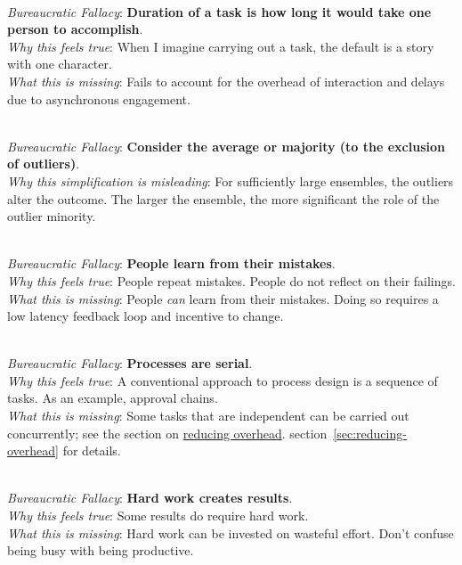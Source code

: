\ \\
\textit{Bureaucratic Fallacy}: \textbf{Duration of a task is how long it would take one person to accomplish}.  \\
\textit{Why this feels true}: When I imagine carrying out a task, the default is a story with one character. \\
\textit{What this is missing}: Fails to account for the overhead of interaction and delays due to asynchronous engagement.


\ \\
\textit{Bureaucratic Fallacy}: \textbf{Consider the average or majority (to the exclusion of outliers)}. \\
\textit{Why this simplification is misleading}: For sufficiently large ensembles, the outliers alter the outcome. The larger the ensemble, the more significant the role of the outlier minority.

\ \\
\textit{Bureaucratic Fallacy}: \textbf{People learn from their mistakes}. \\
\textit{Why this feels true}: People repeat mistakes. People do not reflect on their failings. \\
\textit{What this is missing}: People \textit{can} learn from their mistakes. Doing so requires a low latency feedback loop and incentive to change.

\ \\
\textit{Bureaucratic Fallacy}: \textbf{Processes are serial}.\\
\textit{Why this feels true}: A conventional approach to process design is a sequence of tasks. As an example, approval chains. \\
\textit{What this is missing}: Some tasks that are independent can be carried out concurrently; see the section on \hyperref[sec:reducing-overhead]{reducing overhead}.
\ifsectionref
section~\ref{sec:reducing-overhead} for details.
\fi

\ \\
\textit{Bureaucratic Fallacy}: \textbf{Hard work creates results}.\\
\textit{Why this feels true}: Some results do require hard work. \\
\textit{What this is missing}: Hard work can be invested on wasteful effort. Don't confuse being busy with being productive.

